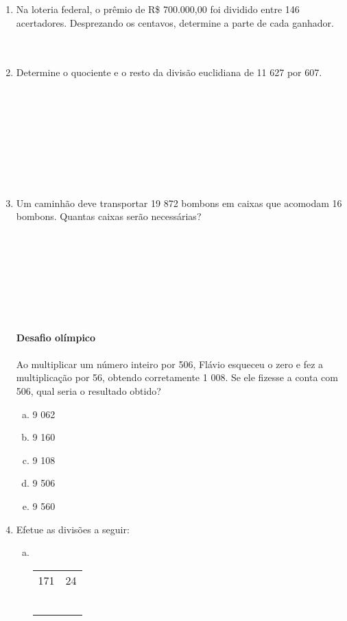\documentclass[a4paper,14pt]{article}
\begin{document}
\begin{multicols}{2}
\begin{enumerate}
   			\item Na loteria federal, o prêmio de R\$ 700.000,00 foi dividido entre 146 acertadores. Desprezando os centavos, determine a parte de cada ganhador. \\\\\\
   			\item Determine o quociente e o resto da divisão euclidiana de 11 627 por 607. \\\\\\\\\\\\\\\\\\
   			\item Um caminhão deve transportar 19 872 bombons em caixas que acomodam 16 bombons. Quantas caixas serão necessárias? \\\\\\\\\\\\\\\\\\
   			\textbf{Desafio olímpico} \\\\
   			Ao multiplicar um número inteiro por 506, Flávio esqueceu o zero e fez a multiplicação por 56, obtendo corretamente 1 008. Se ele fizesse a conta com 506, qual seria o resultado obtido?
   			\begin{enumerate}[a)]
   				\item 9 062
   				\item 9 160
   				\item 9 108
   				\item 9 506
   				\item 9 560
   			\end{enumerate}
   			\item Efetue as divisões a seguir:
   			\begin{enumerate}[a)]
   				\item ~ \\
   				\begin{tabular}{ll}
   					\multicolumn{1}{l|}{171} & 24 \\ \cline{2-2} 
   					~                      & ~ \\\\

\end{tabular}
\end{enumerate}
\end{enumerate}
\end{multicols}
\end{document}
